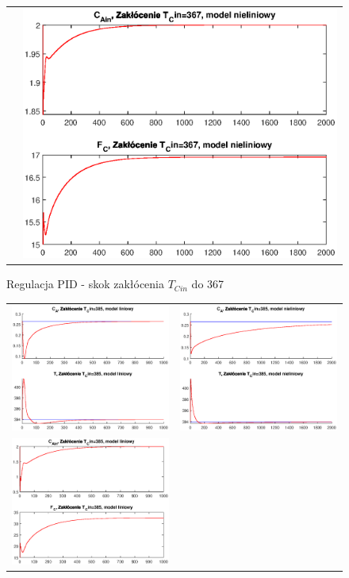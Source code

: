 \begin{figure}
\begin{tabular}{cc}
	&
	\includegraphics[width=.5\linewidth]{img/pidnlin/pidnlin13.eps}
\end{tabular}
\label{ch2:pid7}
\caption{Regulacja PID - skok zakłócenia $T_{Cin}$ do 367}
\end{figure}
\newpage
\begin{figure}
\begin{tabular}{cc}
	\includegraphics[width=.5\linewidth]{img/pidlin/pidlin16.eps}
	&
	\includegraphics[width=.5\linewidth]{img/pidnlin/pidnlin16.eps}
	\\
	\includegraphics[width=.5\linewidth]{img/pidlin/pidlin15.eps}

\end{tabular}
\end{figure}
